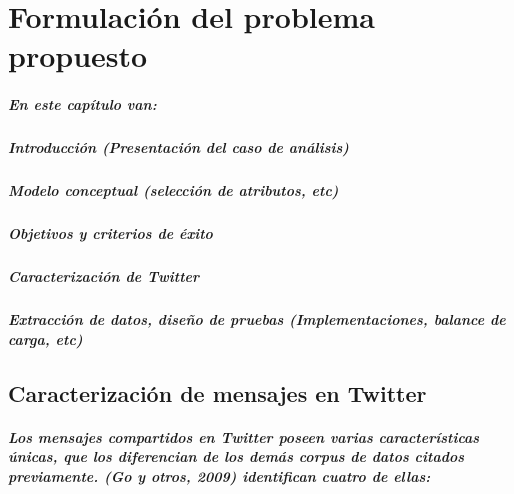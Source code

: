 \chapter{Formulaci\'on del problema propuesto}\label{formulacion}

\paragraph{En este cap\'itulo van:}
\paragraph{Introducci\'on (Presentaci\'on del caso de an\'alisis)}
\paragraph{Modelo conceptual (selecci\'on de atributos, etc)}
\paragraph{Objetivos y criterios de \'exito}
\paragraph{Caracterizaci\'on de Twitter}
\paragraph{Extracci\'on de datos, dise\~no de pruebas (Implementaciones, balance de carga, etc)}

\section{Caracterizaci\'on de mensajes en Twitter}
\paragraph{Los mensajes compartidos en Twitter poseen varias caracter\'isticas \'unicas, que los diferencian de los dem\'as corpus de datos citados previamente. (Go y otros, 2009) identifican cuatro de ellas:}

